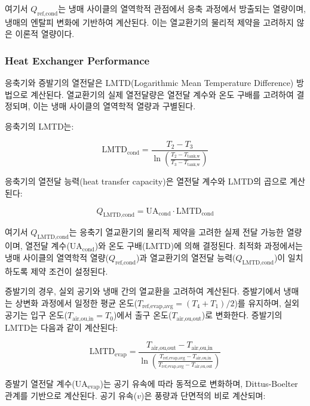 \documentclass[final,5p,times,twocolumn,authoryear]{elsarticle}
\begin{document}
여기서 $Q_{\text{ref,cond}}$는 냉매 사이클의 열역학적 관점에서 응축 과정에서 방출되는 열량이며, 냉매의 엔탈피 변화에 기반하여 계산된다. 이는 열교환기의 물리적 제약을 고려하지 않은 이론적 열량이다.

\subsubsection{Heat Exchanger Performance}

응축기와 증발기의 열전달은 LMTD(Logarithmic Mean Temperature Difference) 방법으로 계산된다.
열교환기의 실제 열전달량은 열전달 계수와 온도 구배를 고려하여 결정되며, 이는 냉매 사이클의 열역학적 열량과 구별된다.

응축기의 LMTD는:

\begin{equation}
\label{eq:hpb_lmtd_cond}
\text{LMTD}_{\text{cond}} = \frac{T_2 - T_3}{\ln\left(\frac{T_2 - T_{\text{tank,w}}}{T_3 - T_{\text{tank,w}}}\right)}
\end{equation}

응축기의 열전달 능력(heat transfer capacity)은 열전달 계수와 LMTD의 곱으로 계산된다:

\begin{equation}
\label{eq:hpb_q_lmtd_cond}
Q_{\text{LMTD,cond}} = \text{UA}_{\text{cond}} \cdot \text{LMTD}_{\text{cond}}
\end{equation}

여기서 $Q_{\text{LMTD,cond}}$는 응축기 열교환기의 물리적 제약을 고려한 실제 전달 가능한 열량이며, 열전달 계수($\text{UA}_{\text{cond}}$)와 온도 구배(LMTD)에 의해 결정된다. 최적화 과정에서는 냉매 사이클의 열역학적 열량($Q_{\text{ref,cond}}$)과 열교환기의 열전달 능력($Q_{\text{LMTD,cond}}$)이 일치하도록 제약 조건이 설정된다.

증발기의 경우, 실외 공기와 냉매 간의 열교환을 고려하여 계산된다. 증발기에서 냉매는 상변화 과정에서 일정한 평균 온도($T_{\text{ref,evap,avg}} = (T_4 + T_1)/2$)를 유지하며, 실외 공기는 입구 온도($T_{\text{air,ou,in}} = T_0$)에서 출구 온도($T_{\text{air,ou,out}}$)로 변화한다. 증발기의 LMTD는 다음과 같이 계산된다:

\begin{equation}
\label{eq:hpb_lmtd_evap}
\text{LMTD}_{\text{evap}} = \frac{T_{\text{air,ou,out}} - T_{\text{air,ou,in}}}{\ln\left(\frac{T_{\text{ref,evap,avg}} - T_{\text{air,ou,in}}}{T_{\text{ref,evap,avg}} - T_{\text{air,ou,out}}}\right)}
\end{equation}

증발기 열전달 계수($\text{UA}_{\text{evap}}$)는 공기 유속에 따라 동적으로 변화하며, Dittus-Boelter 관계를 기반으로 계산된다. 공기 유속($v$)은 풍량과 단면적의 비로 계산되며:
\end{document}
